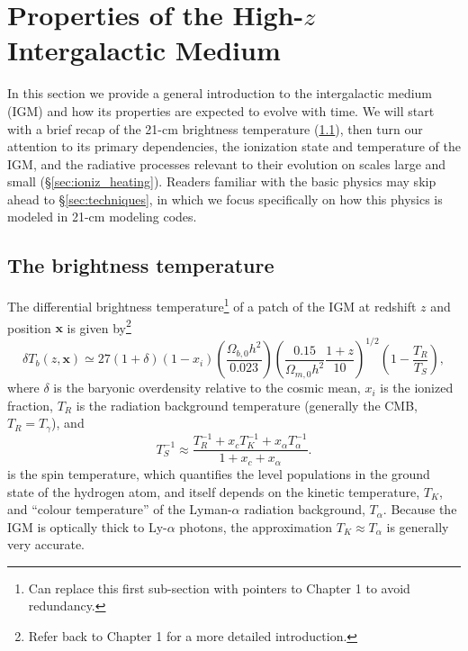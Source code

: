 \section{Properties of the High-$z$ Intergalactic Medium} \label{sec:RT}
In this section we provide a general introduction to the intergalactic medium (IGM) and how its properties are expected to evolve with time. We will start with a brief recap of the 21-cm brightness temperature (\ref{sec:dTb}), then turn our attention to its primary dependencies, the ionization state and temperature of the IGM, and the radiative processes relevant to their evolution on scales large and small (\S\ref{sec:ioniz_heating}). Readers familiar with the basic physics may skip ahead to \S\ref{sec:techniques}, in which we focus specifically on how this physics is modeled in 21-cm modeling codes.

\subsection{The brightness temperature} \label{sec:dTb}
The differential brightness temperature\footnote{Can replace this first sub-section with pointers to Chapter 1 to avoid redundancy.} of a patch of the IGM at redshift $z$ and position $\mathbf{x}$ is given by\footnote{Refer back to Chapter 1 for a more detailed introduction.} 
\begin{equation}
    \delta T_b(z, \mathbf{x}) \simeq 27 (1 + \delta) (1 - x_i) \left(\frac{\Omega_{b,0} h^2}{0.023} \right) \left(\frac{0.15}{\Omega_{m,0} h^2} \frac{1 + z}{10} \right)^{1/2} \left(1 - \frac{T_R}{T_S} \right) , \label{eq:dTb}
\end{equation}
where $\delta$ is the baryonic overdensity relative to the cosmic mean, $x_i$ is the ionized fraction, $T_R$ is the radiation background temperature (generally the CMB, $T_R = T_{\gamma}$), and
\begin{equation}
    T_S^{-1} \approx \frac{T_R^{-1} + x_c T_K^{-1} + x_{\alpha} T_{\alpha}^{-1}}{1 + x_c + x_{\alpha}} . \label{eq:Ts}
\end{equation}
is the spin temperature, which quantifies the level populations in the ground state of the hydrogen atom, and itself depends on the kinetic temperature, $T_K$, and ``colour temperature'' of the Lyman-$\alpha$ radiation background, $T_{\alpha}$. Because the IGM is optically thick to Ly-$\alpha$ photons, the approximation $T_K \approx T_{\alpha}$ is generally very accurate.

